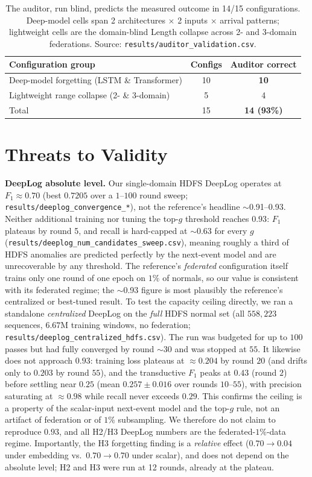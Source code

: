 \documentclass[journal]{IEEEtran}
\begin{document}
\begin{table}[t]
\caption{The auditor, run blind, predicts the measured outcome in 14/15 configurations. Deep-model
cells span 2 architectures $\times$ 2 inputs $\times$ arrival patterns; lightweight cells are the
domain-blind Length collapse across 2- and 3-domain federations. Source:
\texttt{results/auditor\_validation.csv}.}
\label{tab:validation}
\centering
\begin{tabular}{@{}lcc@{}}
\toprule
Configuration group & Configs & Auditor correct \\
\midrule
Deep-model forgetting (LSTM \& Transformer) & 10 & \textbf{10} \\
Lightweight range collapse (2- \& 3-domain)  & 5  & 4 \\
\midrule
Total & 15 & \textbf{14 (93\%)} \\
\bottomrule
\end{tabular}
\end{table}

\section{Threats to Validity}
\textbf{DeepLog absolute level.} Our single-domain HDFS DeepLog operates at $F_1\approx0.70$
(best $0.7205$ over a $1$--$100$ round sweep; \texttt{results/deeplog\_convergence\_*}), not the
reference's headline $\sim$0.91--0.93. Neither additional training nor tuning the top-$g$ threshold
reaches $0.93$: $F_1$ plateaus by round 5, and recall is hard-capped at $\sim$0.63 for every $g$
(\texttt{results/deeplog\_num\_candidates\_sweep.csv}), meaning roughly a third of HDFS anomalies are
predicted perfectly by the next-event model and are unrecoverable by any threshold. The reference's
\emph{federated} configuration itself trains only one round of one epoch on $1\%$ of normals, so our
value is consistent with its federated regime; the $\sim$0.93 figure is most plausibly the
reference's centralized or best-tuned result. To test the capacity ceiling directly, we ran a
standalone \emph{centralized} DeepLog on the \emph{full} HDFS normal set (all $558{,}223$ sequences,
$6.67$M training windows, no federation; \texttt{results/deeplog\_centralized\_hdfs.csv}). The run was
budgeted for up to $100$ passes but had fully converged by round ${\sim}30$ and was stopped at $55$.
It likewise does not approach $0.93$: training loss plateaus at $\approx0.204$ by round $20$
(and drifts only to $0.203$ by round $55$), and the transductive $F_1$ peaks at $0.43$ (round $2$)
before settling near $0.25$ (mean $0.257\pm0.016$ over rounds $10$--$55$), with precision saturating
at $\approx0.98$ while recall never exceeds $0.29$. This confirms the ceiling is a property of the scalar-input
next-event model and the top-$g$ rule, not an artifact of federation or of $1\%$ subsampling. We
therefore do not claim to reproduce $0.93$, and all H2/H3 DeepLog numbers are the federated-$1\%$-data
regime. Importantly, the H3 forgetting finding is a
\emph{relative} effect ($0.70\!\rightarrow\!0.04$ under embedding vs.\ $0.70\!\rightarrow\!0.70$ under
scalar), and does not depend on the absolute level; H2 and H3 were run at 12 rounds, already at the
plateau.
\end{document}
